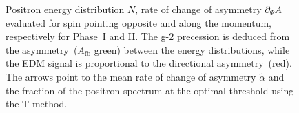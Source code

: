 \begin{refsection}
    \begin{figure}
        \hfill
        \caption[muEDM: sensitivity studies]{Positron energy distribution $N$, rate of change of asymmetry $\partial_\Psi A$ evaluated for spin pointing opposite and along the momentum, respectively for Phase~I and II\@. The g-2 precession is deduced from the asymmetry~($A_\mathrm{fb}$ green) between the energy distributions, while the EDM signal is proportional to the directional asymmetry~(red). The arrows point to the mean rate of change of asymmetry $\tilde \alpha$ and the fraction of the positron spectrum at the optimal threshold using the T-method. }
        \label{fig:n_dot_a}
    \end{figure}
    \begin{figure}

\end{figure}
\end{refsection}
